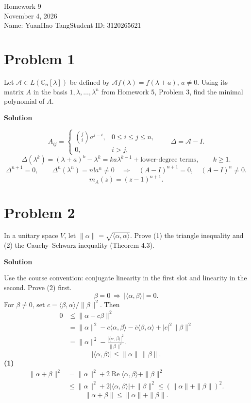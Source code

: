 \documentclass[UTF8,10pt,letterpaper,fontset=fandol]{ctexart}
\newcommand{\C}{\mathbb C}
\newcommand{\ip}[2]{\langle #1,#2\rangle}
\begin{document}
\begin{center}
{\LARGE Homework 9}\\[0.5em]
November 4, 2026\\[0.25em]
Name: YuanHao Tang\quad Student ID: 3120265621
\end{center}
\section{Problem 1}
Let $\mathcal A\in L(\C_n[\lambda])$ be defined by $\mathcal A f(\lambda)=f(\lambda+a)$, $a\ne0$. Using its matrix $A$ in the basis $1,\lambda,\ldots,\lambda^n$ from Homework 5, Problem 3, find the minimal polynomial of $A$.
\par{}\textbf{Solution}\par
\[
 A_{ij}=\begin{cases}\binom ji a^{j-i},&0\le i\le j\le n,\\0,&i>j,\end{cases}
 \qquad \Delta=\mathcal A-I.
\]
\[
 \Delta(\lambda^k)=(\lambda+a)^k-\lambda^k
 =ka\lambda^{k-1}+\text{lower-degree terms},\qquad k\ge1.
\]
\[
 \Delta^{n+1}=0,\qquad \Delta^n(\lambda^n)=n!a^n\ne0
 \quad\Longrightarrow\quad (A-I)^{n+1}=0,\quad(A-I)^n\ne0.
\]
\[
 \boxed{m_A(z)=(z-1)^{n+1}}.
\]
\section{Problem 2}
In a unitary space $V$, let $\|\alpha\|=\sqrt{\ip\alpha\alpha}$. Prove (1) the triangle inequality and (2) the Cauchy--Schwarz inequality (Theorem 4.3).
\par{}\textbf{Solution}\par
Use the course convention: conjugate linearity in the first slot and linearity in the second. Prove (2) first.
\[
 \beta=0\ \Longrightarrow\ |\ip\alpha\beta|=0.
\]
For $\beta\ne0$, set $c=\ip\beta\alpha/\|\beta\|^2$. Then
\begin{align*}
 0&\le\|\alpha-c\beta\|^2\\
  &=\|\alpha\|^2-c\ip\alpha\beta-\bar c\ip\beta\alpha+|c|^2\|\beta\|^2\\
  &=\|\alpha\|^2-\frac{|\ip\alpha\beta|^2}{\|\beta\|^2}.
\end{align*}
\[
 \boxed{|\ip\alpha\beta|\le\|\alpha\|\,\|\beta\|}.
\]
\textbf{(1)}
\begin{align*}
 \|\alpha+\beta\|^2
 &=\|\alpha\|^2+2\operatorname{Re}\ip\alpha\beta+\|\beta\|^2\\
 &\le\|\alpha\|^2+2|\ip\alpha\beta|+\|\beta\|^2
 \le(\|\alpha\|+\|\beta\|)^2.
\end{align*}
\[
 \boxed{\|\alpha+\beta\|\le\|\alpha\|+\|\beta\|}.
\]
\newpage
\end{document}
